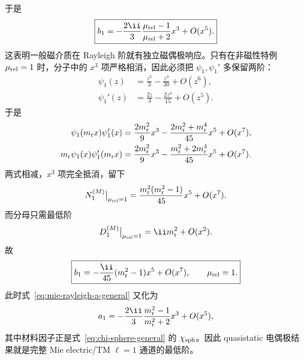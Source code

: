 于是
\begin{equation}
\boxed{
b_1
=-\frac{2\ii}{3}
\frac{\mu_{\rm rel}-1}
{\mu_{\rm rel}+2}x^3
+O(x^5).}
\label{eq:mie-rayleigh-b-general}
\end{equation}
这表明一般磁介质在 Rayleigh 阶就有独立磁偶极响应。只有在非磁性特例 $\mu_{\rm rel}=1$ 时，分子中的 $x^3$ 项严格相消，因此必须把 $\psi_1,\psi_1'$ 多保留两阶：
\begin{align}
\psi_1(z)&=\frac{z^2}{3}-\frac{z^4}{30}+O(z^6),\\
\psi_1'(z)&=\frac{2z}{3}-\frac{2z^3}{15}+O(z^5).
\end{align}
于是
\begin{align}
\psi_1(m_{\rm r}x)\psi_1'(x)
&=\frac{2m_{\rm r}^2}{9}x^3
-\frac{2m_{\rm r}^2+m_{\rm r}^4}{45}x^5+O(x^7),\\
m_{\rm r}\psi_1(x)\psi_1'(m_{\rm r}x)
&=\frac{2m_{\rm r}^2}{9}x^3
-\frac{m_{\rm r}^2+2m_{\rm r}^4}{45}x^5+O(x^7).
\end{align}
两式相减，$x^3$ 项完全抵消，留下
\begin{equation}
N_1^{(M)}\big|_{\mu_{\rm rel}=1}
=\frac{m_{\rm r}^2(m_{\rm r}^2-1)}{45}x^5+O(x^7).
\end{equation}
而分母只需最低阶
\begin{equation}
D_1^{(M)}\big|_{\mu_{\rm rel}=1}
=\ii m_{\rm r}^2+O(x^2).
\end{equation}
故
\begin{equation}
\boxed{
b_1
=-\frac{\ii}{45}
(m_{\rm r}^2-1)x^5+O(x^7),
\qquad
\mu_{\rm rel}=1.}
\label{eq:mie-rayleigh-b-nonmagnetic}
\end{equation}
此时式~\eqref{eq:mie-rayleigh-a-general} 又化为
\begin{equation}
a_1
=-\frac{2\ii}{3}
\frac{m_{\rm r}^2-1}{m_{\rm r}^2+2}x^3+O(x^5),
\end{equation}
其中材料因子正是式~\eqref{eq:chi-sphere-general} 的
$\chi_{\rm sph}$。因此 quasistatic 电偶极结果就是完整 Mie electric/TM $\ell=1$ 通道的最低阶。


